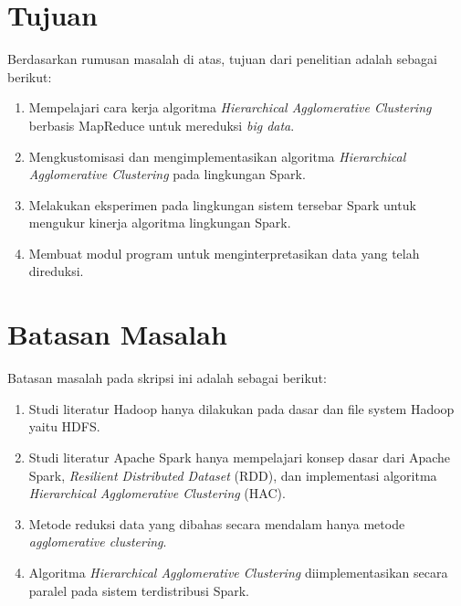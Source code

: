 \section{Tujuan}
\label{sec:tujuan}
Berdasarkan rumusan masalah di atas, tujuan dari penelitian adalah sebagai berikut:
\begin{enumerate}

\item Mempelajari cara kerja algoritma  {\it Hierarchical Agglomerative Clustering} berbasis MapReduce untuk mereduksi {\it big data}.

\item Mengkustomisasi dan mengimplementasikan algoritma {\it Hierarchical Agglomerative Clustering} pada lingkungan Spark.

\item Melakukan eksperimen pada lingkungan sistem tersebar Spark untuk mengukur kinerja algoritma lingkungan Spark.

\item Membuat modul program untuk menginterpretasikan data yang telah direduksi.

\end{enumerate}



\section{Batasan Masalah}
\label{sec:batasan}
Batasan masalah pada skripsi ini adalah sebagai berikut:
\begin{enumerate}

\item Studi literatur Hadoop hanya dilakukan pada dasar dan file system Hadoop yaitu HDFS.

\item Studi literatur Apache Spark hanya mempelajari konsep dasar dari Apache Spark, \textit{Resilient Distributed Dataset} (RDD), dan implementasi algoritma \textit{Hierarchical Agglomerative Clustering} (HAC).

\item Metode reduksi data yang dibahas secara mendalam hanya metode {\it agglomerative clustering}.

\item Algoritma {\it Hierarchical Agglomerative Clustering} diimplementasikan secara paralel pada sistem terdistribusi Spark.

\end{enumerate}


